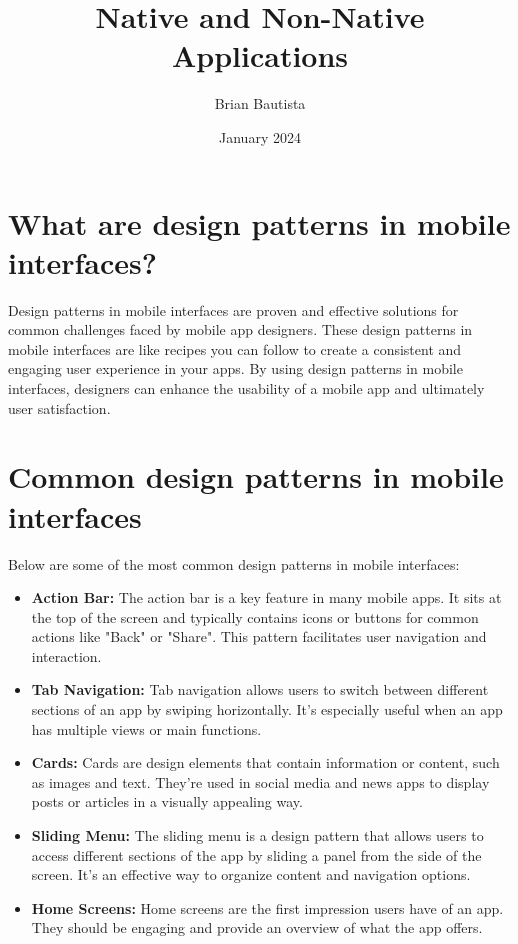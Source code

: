 \documentclass{article}
\title{Native and Non-Native Applications}
\author{Brian Bautista}
\date{January 2024}
\begin{document}
\maketitle

\section*{What are design patterns in mobile interfaces?}
Design patterns in mobile interfaces are proven and effective solutions for common challenges faced by mobile app designers. These design patterns in mobile interfaces are like recipes you can follow to create a consistent and engaging user experience in your apps. By using design patterns in mobile interfaces, designers can enhance the usability of a mobile app and ultimately user satisfaction.

\section{Common design patterns in mobile interfaces}
Below are some of the most common design patterns in mobile interfaces:

\begin{itemize}
\item \textbf{Action Bar:} The action bar is a key feature in many mobile apps. It sits at the top of the screen and typically contains icons or buttons for common actions like "Back" or "Share". This pattern facilitates user navigation and interaction.

\item \textbf{Tab Navigation:} Tab navigation allows users to switch between different sections of an app by swiping horizontally. It's especially useful when an app has multiple views or main functions.

\item \textbf{Cards:} Cards are design elements that contain information or content, such as images and text. They're used in social media and news apps to display posts or articles in a visually appealing way.

\item \textbf{Sliding Menu:} The sliding menu is a design pattern that allows users to access different sections of the app by sliding a panel from the side of the screen. It's an effective way to organize content and navigation options.

\item \textbf{Home Screens:} Home screens are the first impression users have of an app. They should be engaging and provide an overview of what the app offers.
\end{itemize}
\end{document}
